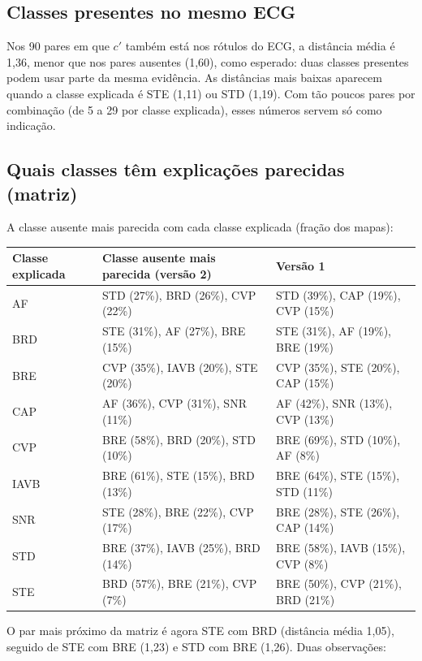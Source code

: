 \documentclass[11pt,a4paper]{article}
\begin{document}
\subsection{Classes presentes no mesmo ECG}
Nos 90 pares em que $c'$ também está nos rótulos do ECG, a distância média é 1,36, menor que nos pares ausentes (1,60), como esperado: duas classes presentes podem usar parte da mesma evidência. As distâncias mais baixas aparecem quando a classe explicada é STE (1,11) ou STD (1,19). Com tão poucos pares por combinação (de 5 a 29 por classe explicada), esses números servem só como indicação.

\subsection{Quais classes têm explicações parecidas (matriz)}
A classe ausente mais parecida com cada classe explicada (fração dos mapas):
\begin{center}\small
\begin{tabularx}{\linewidth}{lXX}
\toprule
\textbf{Classe explicada} & \textbf{Classe ausente mais parecida (versão 2)} & \textbf{Versão 1} \\
\midrule
AF   & STD (27\%), BRD (26\%), CVP (22\%) & STD (39\%), CAP (19\%), CVP (15\%) \\
BRD  & STE (31\%), AF (27\%), BRE (15\%) & STE (31\%), AF (19\%), BRE (19\%) \\
BRE  & CVP (35\%), IAVB (20\%), STE (20\%) & CVP (35\%), STE (20\%), CAP (15\%) \\
CAP  & AF (36\%), CVP (31\%), SNR (11\%) & AF (42\%), SNR (13\%), CVP (13\%) \\
CVP  & BRE (58\%), BRD (20\%), STD (10\%) & BRE (69\%), STD (10\%), AF (8\%) \\
IAVB & BRE (61\%), STE (15\%), BRD (13\%) & BRE (64\%), STE (15\%), STD (11\%) \\
SNR  & STE (28\%), BRE (22\%), CVP (17\%) & BRE (28\%), STE (26\%), CAP (14\%) \\
STD  & BRE (37\%), IAVB (25\%), BRD (14\%) & BRE (58\%), IAVB (15\%), CVP (8\%) \\
STE  & BRD (57\%), BRE (21\%), CVP (7\%) & BRE (50\%), CVP (21\%), BRD (21\%) \\
\bottomrule
\end{tabularx}
\end{center}
O par mais próximo da matriz é agora STE com BRD (distância média 1,05), seguido de STE com BRE (1,23) e STD com BRE (1,26). Duas observações:
\end{document}
